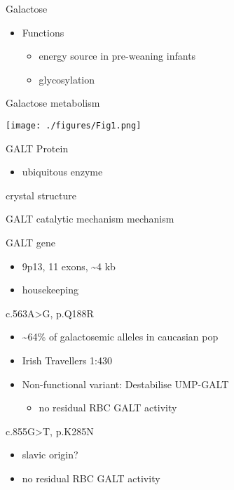 \documentclass[presentation, smaller]{beamer}
\begin{document}
\begin{frame}[label={sec:orgd1f45fb}]{Galactose}
\begin{itemize}
\item Functions
\begin{itemize}
\item energy source in pre-weaning infants
\item glycosylation
\end{itemize}
\end{itemize}
\end{frame}

\begin{frame}[label={sec:org53056ae}]{Galactose metabolism}
\begin{center}
\texttt{[image: ./figures/Fig1.png]}
\end{center}
\end{frame}

\begin{frame}[label={sec:orgd09a685}]{GALT Protein}
\begin{itemize}
\item ubiquitous enzyme
\end{itemize}

\alert{crystal structure}
\end{frame}

\begin{frame}[label={sec:orgab7a534}]{GALT catalytic mechanism}
\alert{mechanism}
\end{frame}

\begin{frame}[label={sec:org28d1686}]{GALT gene}
\begin{itemize}
\item 9p13, 11 exons, \textasciitilde{}4 kb
\item housekeeping
\end{itemize}
\begin{block}{c.563A>G, p.Q188R}
\begin{itemize}
\item \textasciitilde{}64\% of galactosemic alleles in caucasian pop
\item Irish Travellers 1:430
\item Non-functional variant: Destabilise UMP-GALT
\begin{itemize}
\item no residual RBC GALT activity
\end{itemize}
\end{itemize}
\end{block}

\begin{block}{c.855G>T, p.K285N}
\begin{itemize}
\item slavic origin?
\item no residual RBC GALT activity
\end{itemize}
\end{block}
\end{frame}
\end{document}
